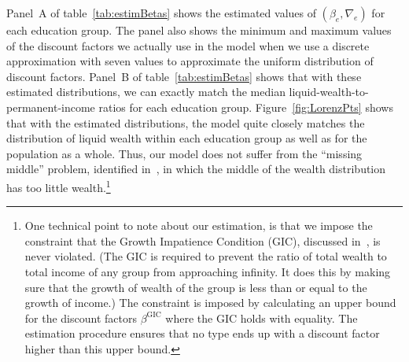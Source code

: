 \documentclass[qe]{econsocart}
\begin{document}
Panel~A of table~\ref{tab:estimBetas} shows the estimated values of $(\beta_e, \nabla_e)$ for each education group.
The panel also shows the minimum and maximum values of the discount factors we actually use in the model when we use a discrete approximation with seven values to approximate the uniform distribution of discount factors.
Panel~B of table~\ref{tab:estimBetas} shows that with these estimated distributions, we can exactly match the median liquid-wealth-to-permanent-income ratios for each education group.
Figure~\ref{fig:LorenzPts} shows that with the estimated distributions, the model quite closely matches the distribution of liquid wealth within each education group as well as for the population as a whole.
Thus, our model does not suffer from the ``missing middle'' problem, identified in~\cite{kaplanMPC2022}, in which the middle of the wealth distribution has too little wealth.\footnote{One technical point to note about our estimation, is that we impose the constraint that the Growth Impatience Condition (GIC), discussed in~\cite{carroll2022theoretical}, is never violated. (The GIC is required to prevent the ratio of total wealth to total income of any group from approaching infinity. It does this by making sure that the growth of wealth of the group is less than or equal to the growth of income.) The constraint is imposed by calculating an upper bound for the discount factors $\beta^{\text{GIC}}$ where the GIC holds with equality. The estimation procedure ensures that no type ends up with a discount factor higher than this upper bound.}
\end{document}
